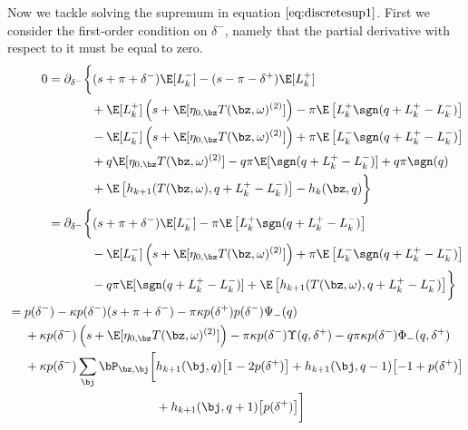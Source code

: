 \documentclass[12pt]{article}
\begin{document}
Now we tackle solving the supremum in equation $\ref{eq:discretesup1}$. First we consider the first-order condition on $\delta^-$, namely that the partial derivative with respect to it must be equal to zero.
\begin{align}
\begin{split}
0 & = \partial_{\delta^-} \biggl\lbrace 
(s + \pi + \delta^-)\E [L_k^-] - (s - \pi - \delta^+)\E[L_k^+] \\
& \hphantom{\partial_{\delta^-} \biggl\lbrace {}+{}} + \E[L_k^+] \left( s + \E[\eta_{0,\bz} T(\bz, \omega)^{(2)}] \right)  - \pi \E \left[L_k^+ \sgn( q + L_k^+ - L_k^-) \right] \\
& \hphantom{\partial_{\delta^-} \biggl\lbrace {}+{}} - \E[L_k^-] \left( s + \E[\eta_{0,\bz} T(\bz, \omega)^{(2)}] \right) + \pi \E \left[ L_k^- \sgn( q + L_k^+ - L_k^-) \right] \\
& \hphantom{\partial_{\delta^-} \biggl\lbrace {}+{}} + q \E[ \eta_{0,\bz} T(\bz, \omega)^{(2)}]  - q \pi \E[ \sgn( q + L_k^+ - L_k^-)] + q \pi \sgn(q)  \\
& \hphantom{\partial_{\delta^-} \biggl\lbrace {}+{}} + \E \left[ h_{k+1}(T(\bz,\omega), q + L_k^+ - L_k^- ) \right] -  h_k(\bz,q) \biggr\rbrace
\end{split} \\
\begin{split}
& = \partial_{\delta^-} \biggl\lbrace 
(s + \pi + \delta^-)\E [L_k^-] - \pi \E \left[L_k^+ \sgn( q + L_k^+ - L_k^-) \right] \\
& \hphantom{\partial_{\delta^-} \biggl\lbrace {}+{}} - \E[L_k^-] \left( s + \E[\eta_{0,\bz} T(\bz, \omega)^{(2)}] \right) + \pi \E \left[ L_k^- \sgn( q + L_k^+ - L_k^-) \right] \\
& \hphantom{\partial_{\delta^-} \biggl\lbrace {}+{}} - q \pi \E[ \sgn( q + L_k^+ - L_k^-)]  + \E \left[ h_{k+1}(T(\bz,\omega), q + L_k^+ - L_k^- ) \right]  \biggr\rbrace
\end{split} \\
\begin{split}
& = p(\delta^-) - \kappa p(\delta^-) (s + \pi + \delta^-) - \pi \kappa p(\delta^+)p(\delta^-)\Psi_-(q) \\
& \hphantom{{}={}} + \kappa p(\delta^-) \left( s + \E[\eta_{0,\bz} T(\bz, \omega)^{(2)}] \right) - \pi \kappa p(\delta^-) \Upsilon(q,\delta^+) - q \pi \kappa p(\delta^-) \Phi_-(q,\delta^+) \\
& \hphantom{{}={}} + \kappa p(\delta^-) \sum_\bj \bP_{\bz,\bj} \biggl[ h_{k+1}(\bj, q) \bigl[ 1 - 2 p(\delta^+) \bigr] + h_{k+1}(\bj, q-1) \bigl[-1 + p(\delta^+) \bigr] \\
& \hphantom{{}={} + \kappa p(\delta^-) \sum_\bj \bP_{\bz,\bj} \biggl[} + h_{k+1}(\bj, q+1) \bigl[ p(\delta^+) \bigr] \biggr]
\end{split}
\end{align}
\end{document}
